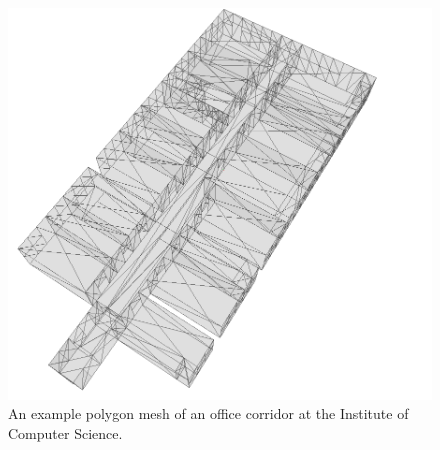 \documentclass[Thesis.tex]{subfiles}
\begin{document}
\begin{figure}%
\includegraphics[width=\columnwidth]{pics/officemap}
\caption[Example polygon mesh]{An example polygon mesh of an office corridor at the Institute of Computer Science.}%
\label{fig:examplemap}%
\end{figure}
\end{document}
